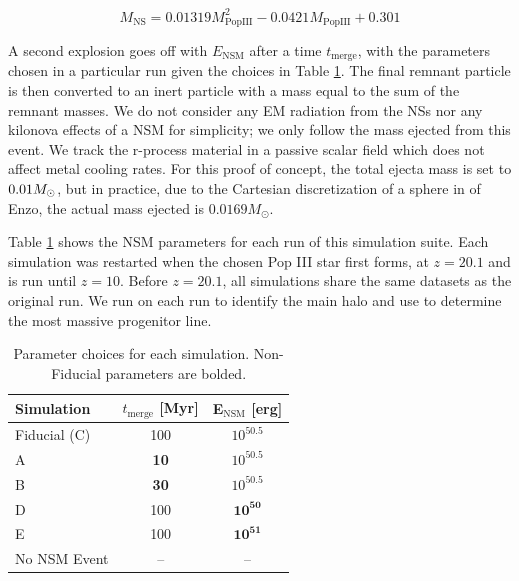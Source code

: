 \documentclass[fleqn,usenatbib]{mnras}
\begin{document}
\begin{equation} \label{eq:nsm_mass}
	M_{\mathrm{NS}} = 0.01319 M_{\mathrm{PopIII}}^{2} - 0.0421 M_{\mathrm{PopIII}} + 0.301
\end{equation}

A second explosion goes off with $E_{\textrm{NSM}}$ after a time $t_{\textrm{merge}}$, with the parameters chosen in a particular run given the choices in Table \ref{tab:NSM_params}. The final remnant particle is then converted to an inert particle with a mass equal to the sum of the remnant masses. We do not consider any EM radiation from the NSs nor any kilonova effects of a NSM for simplicity; we only follow the mass ejected from this event. We track the r-process material in a passive scalar field which does not affect metal cooling rates. For this proof of concept, the total ejecta mass is set to $0.01 \Ms$, but in practice, due to the Cartesian discretization of a sphere in of Enzo, the actual mass ejected is $0.0169 M_{\odot}$.  

Table \ref{tab:NSM_params} shows the NSM parameters for each run of this simulation suite. Each simulation was restarted when the chosen Pop III star first forms, at $z = 20.1$ and is run until $z = 10$. Before $z = 20.1$, all simulations share the same datasets as the original run. We run \rockstar{} \citep{rockstar} on each run to identify the main halo and use \ytree{} \citep{ytree} to determine the most massive progenitor line. 

\begin{table}
	\centering
	\begin{tabular}{lcc} 
		\hline
		Simulation & $t_{\textrm{merge}}$ [Myr] & E$_{\textrm{NSM}}$ [erg] \\
		\hline
		Fiducial (C) & 100 & $10^{50.5}$ \\
		A & \textbf{10} & $10^{50.5}$ \\
		B & \textbf{30} & $10^{50.5}$ \\
		D & 100 & $\mathbf{10^{50}}$ \\
		E & 100 & $\mathbf{10^{51}}$ \\
		No NSM Event & -- & -- \\
		\hline
	\end{tabular}
	\caption{Parameter choices for each simulation. Non-Fiducial parameters are bolded.}
	\label{tab:NSM_params}
\end{table}
\end{document}
